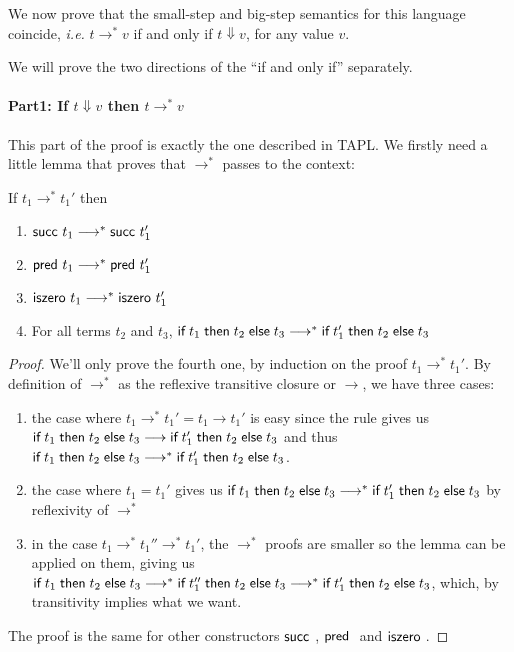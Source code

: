 We now prove that the small-step and big-step semantics for this language
coincide, {\em i.e.} $t \rightarrow^* v$ if and only if $t \Downarrow v$, for
any value $v$.

We will prove the two directions of the ``if and only if'' separately.

\paragraph{Part1: If $t \Downarrow v$ then $t \rightarrow^* v$}
This part of the proof is exactly the one described in TAPL. We firstly need a
little lemma that proves that $\longrightarrow^*$ passes to the context:

\begin{lemma}[A.6]
  If $t_1 \rightarrow^* t_1'$ then
  \begin{enumerate}
    \item $\textsf{succ}~t_1 \longrightarrow^* \textsf{succ}~t_1'$
    \item $\textsf{pred}~t_1 \longrightarrow^* \textsf{pred}~t_1'$
    \item $\textsf{iszero}~t_1 \longrightarrow^* \textsf{iszero}~t_1'$
    \item For all terms $t_2$ and $t_3$,
      $\textsf{if\;} t_1 \textsf{\;then\;} t_2 \textsf{\;else\;} t_3 \longrightarrow^* \textsf{if\;} t_1' \textsf{\;then\;} t_2 \textsf{\;else\;} t_3$
  \end{enumerate}
\end{lemma}

\begin{proof}
  We'll only prove the fourth one, by induction on the proof
  $t_1 \longrightarrow^* t_1'$. By definition of $\longrightarrow^*$ as the
  reflexive transitive closure or $\longrightarrow$, we have three cases:
  \begin{enumerate}
    \item the case where $t_1 \rightarrow^* t_1' = t_1 \rightarrow t_1'$
      is easy since the \EIf rule gives us $\textsf{if\;} t_1 \textsf{\;then\;} t_2 \textsf{\;else\;} t_3
      \longrightarrow \textsf{if\;} t_1' \textsf{\;then\;} t_2 \textsf{\;else\;} t_3$ and thus $\textsf{if\;} t_1 \textsf{\;then\;} t_2 \textsf{\;else\;} t_3
      \longrightarrow^* \textsf{if\;} t_1' \textsf{\;then\;} t_2 \textsf{\;else\;} t_3$.
      
    \item the case where $t_1 = t_1'$ gives us
      $\textsf{if\;} t_1 \textsf{\;then\;} t_2 \textsf{\;else\;} t_3 \longrightarrow^* \textsf{if\;} t_1' \textsf{\;then\;} t_2 \textsf{\;else\;} t_3$ by
      reflexivity of $\rightarrow^*$
    
    \item in the case $t_1 \rightarrow^* t_1'' \rightarrow^* t_1'$,
      the $\rightarrow^*$ proofs are smaller so the lemma can be applied on
      them, giving us $\textsf{if\;} t_1 \textsf{\;then\;} t_2 \textsf{\;else\;} t_3 \longrightarrow^*
      \textsf{if\;} t_1'' \textsf{\;then\;} t_2 \textsf{\;else\;} t_3 \longrightarrow^* \textsf{if\;} t_1' \textsf{\;then\;} t_2 \textsf{\;else\;} t_3$, which,
      by transitivity implies what we want.
  \end{enumerate}
  The proof is the same for other constructors $\tmsucc$, $\tmpred$ and
  $\tmiszero$.
\end{proof}

